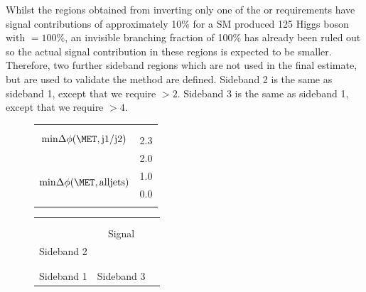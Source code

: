 Whilst the regions obtained from inverting only one of the \jetmetdphi or \METsig requirements have signal contributions of approximately 10\% for a \ac{SM} produced 125 \GeV Higgs boson with \BRinv$=100\%$, an invisible branching fraction of 100\% has already been ruled out so the actual signal contribution in these regions is expected to be smaller. Therefore, two further sideband regions which are not used in the final estimate, but are used to validate the method are defined. Sideband 2 is the same as sideband 1, except that we require \jetmetdphileading$>2$. Sideband 3 is the same as sideband 1, except that we require \METsig$>4$. 



\begin{figure}[h!]
\begin{center}
  \begin{tabular}{c r}
    &   \\
    \multirow{4}{*}{$\mathrm{min}\Delta\phi(\MET,\mathrm{j1/j2})$} & \\
    & \multirow{2}{*}{2.3} \\
    &  \\
    & \multirow{2}{*}{2.0}  \\
    & \\
    & \multirow{2}{*}{1.0}\\
    \multirow{2}{*}{$\mathrm{min}\Delta\phi(\MET,\mathrm{all jets})$} & \\
    & \multirow{2}{*}{0.0}\\
    & \\
    & \\
  \end{tabular}
  \begin{tabular}{c c c | c c c c}
\multicolumn{7}{|c}{}\\
\multicolumn{3}{|c|}{{\cellcolor{cyan}}} & \multicolumn{3}{|c}{\cellcolor{green}} & \\
\multicolumn{3}{|c|}{{\cellcolor{cyan}}} & \multicolumn{3}{|c}{\multirow{-2}{*}{\cellcolor{green}Signal}}  & \multirow{4}{*}{} \\
\cline{4-7}
\multicolumn{3}{|c|}{\multirow{-2}{*}{{\cellcolor{cyan}} Sideband 2}} & \multicolumn{3}{|c}{} & \\
\multicolumn{3}{|c|}{\multirow{-2}{*}{{\cellcolor{cyan}}}} & \multicolumn{3}{|c}{} & \\
\hline
\multicolumn{3}{|c|}{{\cellcolor{cyan}}} & \multicolumn{3}{|c}{\cellcolor{cyan}} & \\
\multicolumn{3}{|c|}{\multirow{-2}{*}{{\cellcolor{cyan}}Sideband 1}} & \multicolumn{3}{|c}{\multirow{-2}{*}{\cellcolor{cyan}Sideband 3}} & \\

\end{tabular}
\end{center}
\end{figure}
